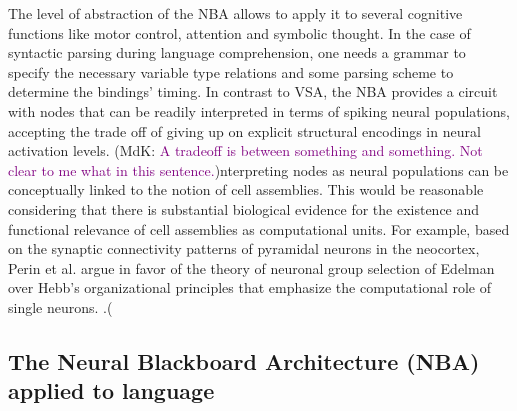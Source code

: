 \documentclass[10pt]{article}
\newcommand{\noteCP}[1]{}
\newcommand{\noteMdK}[2]{}
\newcommand{\noteMP}[3]{(}
\newcommand{\notenewMdK}[2]{(MdK: \textcolor{purple}{#1})}
\begin{document}
The level of abstraction of the NBA allows to apply it to several cognitive functions like motor control, attention and symbolic thought.
In the case of syntactic parsing during language comprehension, one needs a grammar to specify the necessary variable type relations and some parsing scheme to determine the bindings' timing.
In contrast to VSA, the NBA provides a circuit with nodes that can be readily interpreted in terms of spiking neural populations, accepting the trade off of giving up on 
explicit structural encodings in neural activation levels.
\notenewMdK{A tradeoff is between something and something. Not clear to me what in this sentence.}
Interpreting nodes as neural populations can be conceptually linked to the notion of cell assemblies.
This would be reasonable considering that there is substantial biological evidence for the existence and functional relevance of cell assemblies as computational units\cite{Huyck_2013}.
For example, based on the synaptic connectivity patterns of pyramidal neurons in the neocortex, Perin et al.\cite{Perin_2011} argue 
in favor of the theory of neuronal group selection of Edelman\cite{edelman1987neural} 
over Hebb's organizational principles\cite{hebb2005organization} that emphasize the computational role of single neurons.
\noteCP{This sentence needs to be developped, or delected if not crucial}.\noteMP{I think developing this point is an overkill, I was just trying to say that there alternative theories that support a different view from neurons as the main units in explicit vector encodings, to give more substance to the notion of cell assemblies than just citing the review from Huyck. But then deleting it also feels like losing justification for my argument that there is substancial evidence, do you think the previous sentence would be fine by itself?}
\noteMdK{Agree with Chris here.}

\subsection{The Neural Blackboard Architecture (NBA) applied to language}

{\label{935508}}
\end{document}
